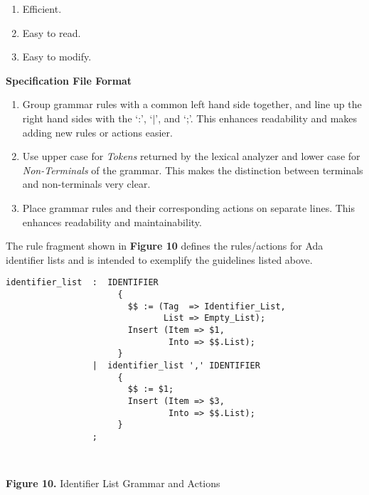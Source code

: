 \begin{center}
\begin{enumerate}
\item Efficient.
\item Easy to read.
\item Easy to modify.
\end{enumerate}
\end{center}

{\bf Specification File Format}
\medskip
\begin{enumerate}
\item Group grammar rules with a common left hand side together, and line up the
right hand sides with the `:', `$|$', and `;'.  This enhances readability and
makes adding new rules or actions easier.
\item Use upper case for {\it Tokens} returned by the lexical analyzer and lower
case for {\it Non-Terminals} of the grammar.  This makes the distinction
between terminals and non-terminals very clear.
\item Place grammar rules and their corresponding actions on separate
lines.  This enhances readability and maintainability.
\end{enumerate}

The rule fragment shown in {\bf Figure 10} defines the rules/actions for Ada
identifier lists and is intended to exemplify the guidelines
listed above.
\newpage
\noindent\hspace{-0.05in}\hrulefill\hspace{0.0in}\\
\vspace{-0.2in}
\begin{verbatim}
identifier_list  :  IDENTIFIER
                      {
                        $$ := (Tag  => Identifier_List,
                               List => Empty_List);
                        Insert (Item => $1,
                                Into => $$.List);
                      }
                 |  identifier_list ',' IDENTIFIER
                      {
                        $$ := $1;
                        Insert (Item => $3,
                                Into => $$.List);
                      }
                 ;
\end{verbatim}
\hspace{-0.05in}\hrulefill\hspace{0.0in}\\
\centerline{{\bf Figure 10.} Identifier List Grammar and Actions}
\newpage
